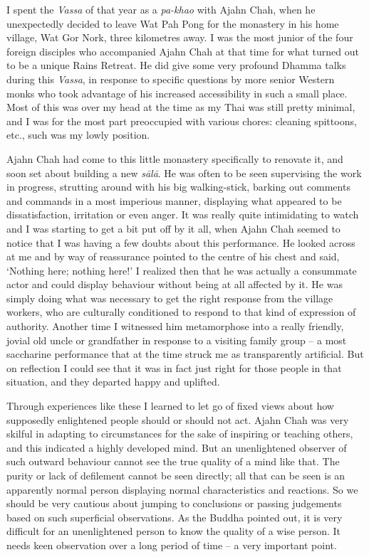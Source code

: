 I spent the \emph{Vassa} of that year as a \emph{pa-khao} with Ajahn
Chah, when he unexpectedly decided to leave Wat Pah Pong for the
monastery in his home village, Wat Gor Nork, three kilometres away. I
was the most junior of the four foreign disciples who accompanied Ajahn
Chah at that time for what turned out to be a unique Rains Retreat. He
did give some very profound Dhamma talks during this \emph{Vassa}, in
response to specific questions by more senior Western monks who took
advantage of his increased accessibility in such a small place. Most of
this was over my head at the time as my Thai was still pretty minimal, 
and I was for the most part preoccupied with various chores: cleaning
spittoons, etc., such was my lowly position.

Ajahn Chah had come to this little monastery specifically to renovate
it, and soon set about building a new \emph{sālā}. He was often to be
seen supervising the work in progress, strutting around with his big
walking-stick, barking out comments and commands in a most imperious
manner, displaying what appeared to be dissatisfaction, irritation or
even anger. It was really quite intimidating to watch and I was starting
to get a bit put off by it all, when Ajahn Chah seemed to notice that I
was having a few doubts about this performance. He looked across at me
and by way of reassurance pointed to the centre of his chest and said, 
`Nothing here; nothing here!' I realized then that he was actually a
consummate actor and could display behaviour without being at all
affected by it. He was simply doing what was necessary to get the right
response from the village workers, who are culturally conditioned to
respond to that kind of expression of authority. Another time I
witnessed him metamorphose into a really friendly, jovial old uncle or
grandfather in response to a visiting family group -- a most saccharine
performance that at the time struck me as transparently artificial. But
on reflection I could see that it was in fact just right for those
people in that situation, and they departed happy and uplifted. 

Through experiences like these I learned to let go of fixed views about
how supposedly enlightened people should or should not act. Ajahn Chah
was very skilful in adapting to circumstances for the sake of inspiring
or teaching others, and this indicated a highly developed mind. But an
unenlightened observer of such outward behaviour cannot see the true
quality of a mind like that. The purity or lack of defilement cannot be
seen directly; all that can be seen is an apparently normal person
displaying normal characteristics and reactions. So we should be very
cautious about jumping to conclusions or passing judgements based on
such superficial observations. As the Buddha pointed out, it is very
difficult for an unenlightened person to know the quality of a wise
person. It needs keen observation over a long period of time -- a very
important point. 

